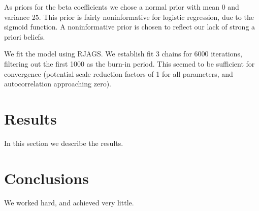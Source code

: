 \documentclass[12pt]{article}
\begin{document}
As priors for the beta coefficients we chose a normal prior with mean 0 and variance 25. This prior is fairly noninformative for logistic regression, due to the sigmoid function. A noninformative prior is chosen to reflect our lack of strong a priori beliefs.

We fit the model using RJAGS. We establish fit 3 chains for 6000 iterations, filtering out the first 1000 as the burn-in period. This seemed to be sufficient for convergence (potential scale reduction factors of 1 for all parameters, and autocorrelation approaching zero).

\section{Results}\label{results}
In this section we describe the results.

\section{Conclusions}\label{conclusions}
We worked hard, and achieved very little.
\end{document}
